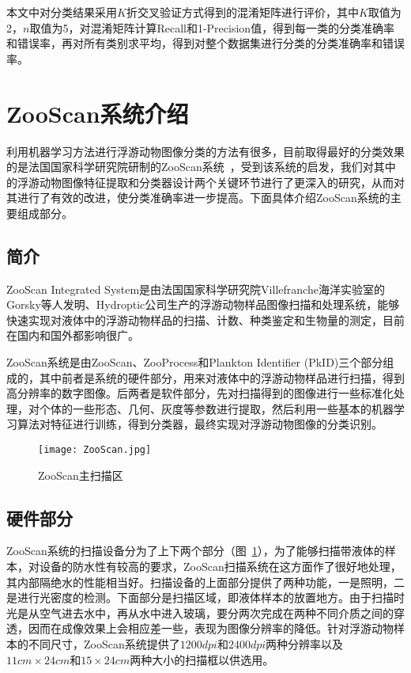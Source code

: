本文中对分类结果采用$K$折交叉验证方式得到的混淆矩阵进行评价，其中$K$取值为2，$n$取值为5，对混淆矩阵计算Recall和1-Precision值，得到每一类的分类准确率和错误率，再对所有类别求平均，得到对整个数据集进行分类的分类准确率和错误率。

\section{ZooScan系统介绍}

利用机器学习方法进行浮游动物图像分类的方法有很多，目前取得最好的分类效果的是法国国家科学研究院研制的ZooScan系统~\cite{gorsky2010digital}，受到该系统的启发，我们对其中的浮游动物图像特征提取和分类器设计两个关键环节进行了更深入的研究，从而对其进行了有效的改进，使分类准确率进一步提高。下面具体介绍ZooScan系统的主要组成部分。

\subsection{简介}

ZooScan Integrated System是由法国国家科学研究院Villefranche海洋实验室的Gorsky等人发明、Hydroptic公司生产的浮游动物样品图像扫描和处理系统，能够快速实现对液体中的浮游动物样品的扫描、计数、种类鉴定和生物量的测定，目前在国内和国外都影响很广。

ZooScan系统是由ZooScan、ZooProcess和Plankton Identifier (PkID)三个部分组成的，其中前者是系统的硬件部分，用来对液体中的浮游动物样品进行扫描，得到高分辨率的数字图像。后两者是软件部分，先对扫描得到的图像进行一些标准化处理，对个体的一些形态、几何、灰度等参数进行提取，然后利用一些基本的机器学习算法对特征进行训练，得到分类器，最终实现对浮游动物图像的分类识别。

\begin{figure}[!ht] %
\centering
\texttt{[image: ZooScan.jpg]}
\caption{ZooScan主扫描区}
\label{fig: ZooScan}
\end{figure}

\subsection{硬件部分}

ZooScan系统的扫描设备分为了上下两个部分（图~\ref{fig: ZooScan}），为了能够扫描带液体的样本，对设备的防水性有较高的要求，ZooScan扫描系统在这方面作了很好地处理，其内部隔绝水的性能相当好。扫描设备的上面部分提供了两种功能，一是照明，二是进行光密度的检测。下面部分是扫描区域，即液体样本的放置地方。由于扫描时光是从空气进去水中，再从水中进入玻璃，要分两次完成在两种不同介质之间的穿透，因而在成像效果上会相应差一些，表现为图像分辨率的降低。针对浮游动物样本的不同尺寸，ZooScan系统提供了$1200dpi$和$2400dpi$两种分辨率以及$11cm\times24cm$和$15\times24cm$两种大小的扫描框以供选用。

